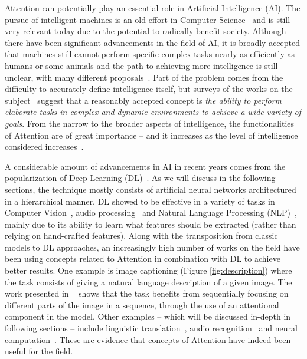 \documentclass[12pt]{article}
\begin{document}
Attention can potentially play an essential role in Artificial Intelligence (AI).
The pursue of intelligent machines is an old effort in Computer Science~\cite{ref:turing} and is still very
relevant today due to the potential to radically benefit society.
Although there have been significant advancements in the field of AI, it is broadly accepted that
machines still cannot perform specific complex tasks nearly as efficiently as humans or some animals and
the path to achieving more intelligence is still unclear, with many different proposals~\cite{ref:mikolov}.
Part of the problem comes from the difficulty to accurately define intelligence itself, but
surveys of the works on the subject~\cite{ref:aidef} suggest that a reasonably accepted
concept is \emph{the ability to perform elaborate tasks in complex and dynamic environments
to achieve a wide variety of goals}.
From the narrow to the broader aspects of intelligence, the functionalities of Attention
are of great importance -- and it increases
as the level of intelligence considered increases~\cite{ref:helgason}.

A considerable amount of advancements in AI in recent years comes from
the popularization of Deep Learning (DL)~\cite{ref:dl}.
As we will discuss in the following sections, the technique mostly consists of
artificial neural networks architectured in a hierarchical manner.
DL showed to be effective in a variety of tasks in Computer Vision~\cite{ref:imagenet}\cite{ref:segmentation},
audio processing~\cite{ref:wavenet} and Natural Language
Processing (NLP)~\cite{ref:att-all-you-need}, mainly due to its ability
to learn what features should be extracted (rather than relying on hand-crafted features).
Along with the transposition from classic models to DL
approaches, an increasingly high number of works on the field
have been using concepts related to Attention in combination with DL to achieve better results.
One example is image captioning (Figure \ref{fig:description}) where the task
consists of giving a natural language description of a given image.
The work presented in ~\cite{ref:img-captioning} shows that the task benefits from
sequentially focusing on different parts of the image in a sequence,
through the use of an attentional component in the model.
Other examples -- which will be discussed in-depth in following sections -- include linguistic
translation~\cite{ref:translation}, audio recognition~\cite{ref:audio} and neural computation~\cite{ref:ntm}.
These are evidence that concepts of Attention have indeed been useful for the field.
\end{document}
